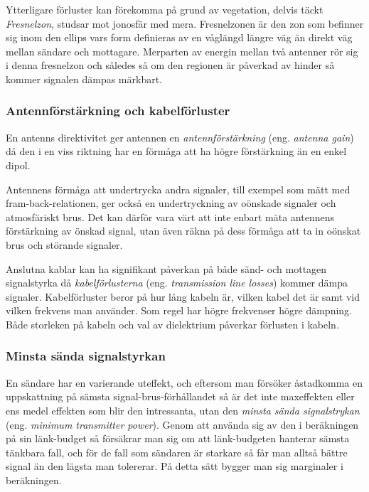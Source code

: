 Ytterligare förluster kan förekomma på grund av vegetation, delvis täckt
\emph{Fresnelzon}, studsar mot jonosfär med mera.
Fresnelzonen är den zon som befinner sig inom den ellips vars form definieras
av en våglängd längre väg än direkt väg mellan sändare och mottagare.
Merparten av energin mellan två antenner rör sig i denna fresnelzon och
således så om den regionen är påverkad av hinder så kommer signalen dämpas
märkbart.

\subsubsection{Antennförstärkning och kabelförluster}

En antenns direktivitet ger antennen en \emph{antennförstärkning} (eng.
\emph{antenna gain}) då den i en viss riktning har en förmåga att ha högre
förstärkning än en enkel dipol.

Antennens förmåga att undertrycka andra signaler, till exempel som mätt med
fram-back-relationen, ger också en undertryckning av oönskade signaler och
atmosfäriskt brus.
Det kan därför vara värt att inte enbart mäta antennens förstärkning av
önskad signal, utan även räkna på dess förmåga att ta in oönskat brus och
störande signaler.

Anslutna kablar kan ha signifikant påverkan på både sänd- och mottagen
signalstyrka då \emph{kabelförlusterna} (eng. \emph{transmission line losses})
kommer dämpa signaler.
Kabelförluster beror på hur lång kabeln är, vilken kabel det är samt vid
vilken frekvens man använder.
Som regel har högre frekvenser högre dämpning.
Både storleken på kabeln och val av dielektrium påverkar förlusten i kabeln.

\subsubsection{Minsta sända signalstyrkan}

En sändare har en varierande uteffekt, och eftersom man försöker åstadkomma en
uppskattning på sämsta signal-brus-förhållandet så är det inte maxeffekten
eller ens medel effekten som blir den intressanta, utan den \emph{minsta sända
signalstrykan} (eng. \emph{minimum transmitter power}).
Genom att använda sig av den i beräkningen på sin länk-budget så försäkrar man
sig om att länk-budgeten hanterar sämsta tänkbara fall, och för de fall som
sändaren är starkare så får man alltså bättre signal än den lägsta man
tolererar.
På detta sätt bygger man sig marginaler i beräkningen.

